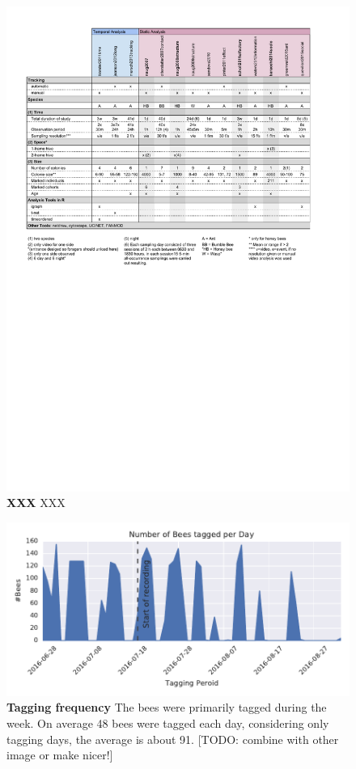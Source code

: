 \begin{figure}[htb]
	\centering
	\includegraphics[width=1.0\textwidth]{Figures/study-study}
	\caption[XXX]{\textbf{XXX} XXX}
	\label{fig:study-study}
\end{figure}


\begin{figure}[htb]
	\centering
	\includegraphics[width=1.0\textwidth]{Figures/tagging_period}
	\caption[Tagging frequency]{\textbf{Tagging frequency} The bees were primarily tagged during the week. On average 48 bees were tagged each day, considering only tagging days, the average is about 91. [TODO: combine with other image or make nicer!]}
	\label{fig:tagging-period}
\end{figure}

